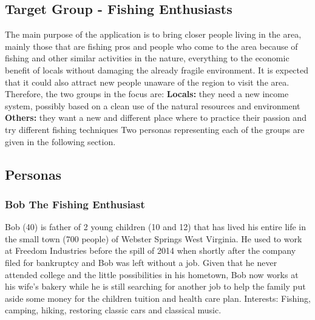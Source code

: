 \subsection{Target Group - Fishing Enthusiasts}
The main purpose of the application is to bring closer people living in the area, mainly those that are fishing pros and people who come to the area because of fishing and other similar activities in the nature, everything to the economic benefit of locals without damaging the already fragile environment. It is expected that it could also attract new people unaware of the region to visit the area. Therefore, the two groups in the focus are:  
\newline
\textbf{Locals:} they need a new income system, possibly based on a clean use of the natural resources and environment 
\newline
\textbf{Others:} they want a new and different place where to practice their passion and try different fishing techniques 
\newline 
\newline
Two personas representing each of the groups are given in the following section.

\subsection{Personas}
\subsubsection*{Bob The Fishing Enthusiast}
Bob (40) is father of 2 young children (10 and 12) that has lived his entire life in the small town (700 people) of Webster Springs West Virginia. He used to work at Freedom Industries before the spill of 2014 when shortly after the company filed for bankruptcy and Bob was left without a job. Given that he never attended college and the little possibilities in his hometown, Bob now works at his wife's bakery while he is still searching for another job to help the family put aside some money for the children tuition and health care plan.
\newline
Interests: Fishing, camping, hiking, restoring classic cars and classical music. 
\newline



